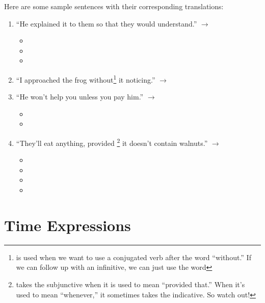 Here are some sample sentences with their corresponding translations:
	\begin{enumerate}[noitemsep]
		\item ``He explained it to them so that they would understand.'' $\rightarrow $ 
			\begin{itemize}[noitemsep]
				\item {}
				\item {}
				\item {}
			\end{itemize}
		\item ``I approached the frog without\footnote{ is used when we want to use a conjugated verb after the word ``without.'' If we can follow up with an infinitive, we can just use the word } it noticing.'' $\rightarrow$ 
		\item ``He won't help you unless you pay him.'' $\rightarrow$
			\begin{itemize}[noitemsep]
				\item {}
				\item {}
			\end{itemize}
		\item ``They'll eat anything, provided \footnote{ takes the subjunctive when it is used to mean ``provided that.'' When it's used to mean ``whenever,'' it sometimes takes the indicative. So watch out!} it doesn't contain walnuts.'' $\rightarrow$ 
			\begin{itemize}[noitemsep]
				\item {}
				\item {}
				\item {}
				\item {}
			\end{itemize}
	\end{enumerate}

\section{Time Expressions}

